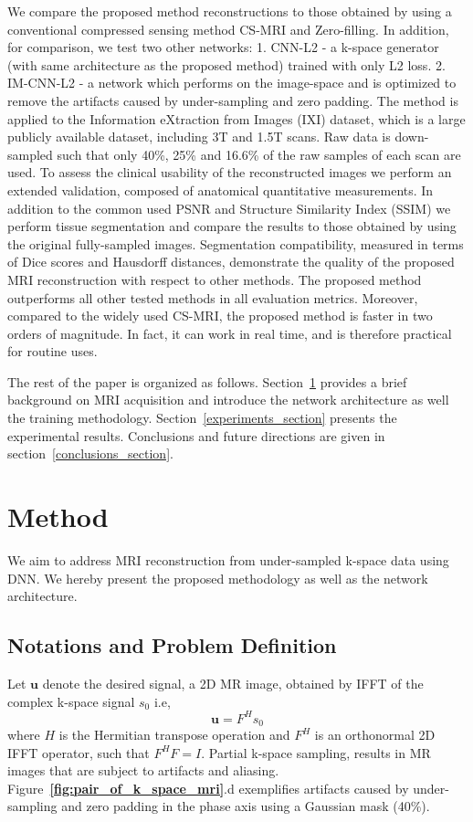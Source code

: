 \documentclass[review]{elsarticle}
\begin{document}
We compare the proposed method reconstructions to those obtained by using a conventional compressed sensing method CS-MRI \cite{lustig2007sparse} and Zero-filling. In addition, for comparison, we test two other networks: 1. CNN-L2 - a k-space generator (with same architecture as the proposed method) trained with only L2 loss. 2. IM-CNN-L2 - a network which performs on the image-space and is optimized to remove the artifacts caused by under-sampling and zero padding.
The method is applied to the Information eXtraction from Images (IXI) dataset, which is a large publicly available dataset, including 3T and 1.5T scans. Raw data is down-sampled such that only 40\%, 25\% and 16.6\% of the raw samples of each scan are used.
To assess the clinical usability of the reconstructed images we perform an extended validation, composed of anatomical quantitative measurements. In addition to the common used PSNR and Structure Similarity Index (SSIM) we perform tissue segmentation and compare the results to those obtained by using the original fully-sampled images.
Segmentation compatibility, measured in terms of Dice scores and Hausdorff distances, demonstrate the quality of the proposed MRI reconstruction with respect to other methods.
The proposed method outperforms all other tested methods in all evaluation metrics. Moreover, compared to the widely used CS-MRI, the proposed method is faster in two orders of magnitude. In fact, it can work in real time, and is therefore practical for routine uses.

The rest of the paper is organized as follows. Section~\ref{method_section} provides a brief background on MRI acquisition and introduce the network architecture as well the training methodology. Section~\ref{experiments_section} presents the experimental results. Conclusions and future directions are given in section~\ref{conclusions_section}.

\section{Method}\label{method_section}
We aim to address MRI reconstruction from under-sampled k-space data using DNN. We hereby present the proposed methodology as well as the network architecture.
\subsection{Notations and Problem Definition}
Let $\bm{u}$ denote the desired signal, a 2D MR image, obtained by IFFT of the complex k-space signal $s_{0}$ i.e, 
\begin{equation}
\bm{u}=F^{H}s_{0}
\end{equation} 
where $H$ is the Hermitian transpose operation and $F^{H}$ is an orthonormal 2D IFFT operator, such that $F^{H}F=I$. 
Partial k-space sampling, results in MR images that are subject to artifacts and aliasing. 
Figure~\textbf{\ref{fig:pair_of_k_space_mri}}.d exemplifies artifacts caused by under-sampling and zero padding in the phase axis using a Gaussian mask (40\%).
\end{document}
